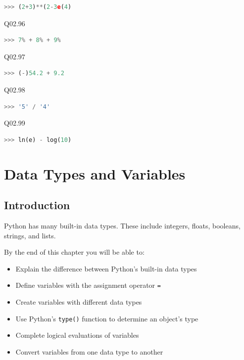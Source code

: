 \documentclass{book}
\begin{document}
\begin{lstlisting}[language=Python]
>>> (2+3)**(2-3e(4)
\end{lstlisting}

Q02.96

\begin{lstlisting}[language=Python]
>>> 7% + 8% + 9%
\end{lstlisting}

Q02.97

\begin{lstlisting}[language=Python]
>>> (-)54.2 + 9.2
\end{lstlisting}

Q02.98

\begin{lstlisting}[language=Python]
>>> '5' / '4'
\end{lstlisting}

Q02.99

\begin{lstlisting}[language=Python]
>>> ln(e) - log(10)
\end{lstlisting}
    




    
        \chapter{Data Types and Variables}\label{data-types-and-variables}
    




    
        \section{Introduction}\label{introduction}
        \newpage



    




    
        Python has many built-in data types. These include integers, floats,
booleans, strings, and lists.

By the end of this chapter you will be able to:

\begin{itemize}
\item
  Explain the difference between Python's built-in data types
\item
  Define variables with the assignment operator \lstinline!=!
\item
  Create variables with different data types
\item
  Use Python's \lstinline!type()! function to determine an object's type
\item
  Complete logical evaluations of variables
\item
  Convert variables from one data type to another
\end{itemize}
        \newpage
\end{document}
